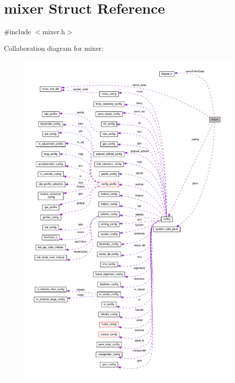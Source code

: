 \hypertarget{structmixer}{\section{mixer Struct Reference}
\label{structmixer}
}


{\ttfamily \#include $<$mixer.\+h$>$}



Collaboration diagram for mixer\+:\nopagebreak
\begin{figure}[H]
\begin{center}
\leavevmode
\includegraphics[width=350pt]{structmixer__coll__graph}
\end{center}
\end{figure}

